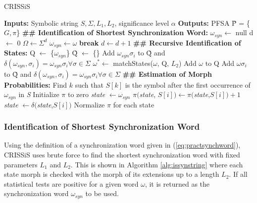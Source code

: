 {\begin{algorithm} 
  \caption{CRISSiS\label{alg:crissis}}
    \begin{algorithmic}[1]
      \State \textbf{Inputs:} Symbolic string $S, \Sigma, L_1, L_2$, significance level $\alpha$
      \State \textbf{Outputs:} PFSA \^{P} = \{$G, \pi$\}
      \State \textbf{\#\# Identification of Shortest Synchronization Word:}
      \State $\omega_{syn} \leftarrow $ null
      \State d $\leftarrow $ 0
      	\State $\Omega \leftarrow \Sigma^d$
      	\ForAll{$\omega \in \Omega$}
      			\State $\omega_{syn}\leftarrow\omega$
      			\State \textbf{break}
      		\EndIf
      	\EndFor
      	\State $d \leftarrow d + 1$
      \EndWhile
      \State \textbf{\#\# Recursive Identification of States:}
      \State Q $\leftarrow$ \{$\omega_{syn}$\}
      \State \~{Q} $\leftarrow$ \{\}
      \State Add $\omega_{syn}\sigma_i$ to \~{Q} and $\delta(\omega_{syn},\sigma_i) = \omega_{syn}\sigma_i  \forall \sigma\in\Sigma$
      		\State $\omega^* \leftarrow$ matchStates($\omega$, Q, $L_2$)
      			\State Add $\omega$ to Q
      			\State Add $\omega\sigma_i$ to \~{Q} and $\delta(\omega_{syn},\sigma_i) = \omega_{syn}\sigma_i  \forall \sigma\in\Sigma$
      		\Else
      		\EndIf
      	\EndIf
      \EndFor
      \State \textbf{\#\# Estimation of Morph Probabilities:}
      \State Find $k$ such that $S[k]$ is the symbol after the first occurrence of $\omega_{syn}$ in \textit{S}
      \State Initialize $\pi$ to zero
      \State \textit{state} $\leftarrow \omega_{syn}$
		\State $\pi($\textit{state}, $S[i]) \leftarrow \pi($\textit{state},$S[i]) + 1$
		\State \textit{state} $\leftarrow \delta($\textit{state},$S[i])$      
      \EndFor 
      \State Normalize $\pi$ for each state
    \end{algorithmic}
  \end{algorithm}
  
\subsubsection{Identification of Shortest Synchronization Word}

Using the definition of a synchronization word given in (\ref{eq:practsynchword}), CRISSiS uses brute force to find the shortest synchronization word with fixed parameters $L_1$ and $L_2$. This is shown in Algorithm \ref{alg:issynstring} where each state morph is checked with the morph of its extensions up to a length $L_2$. If all statistical tests are positive for a given word $\omega$, it is returned as the synchronization word $\omega_{syn}$ to be used.
  
}
